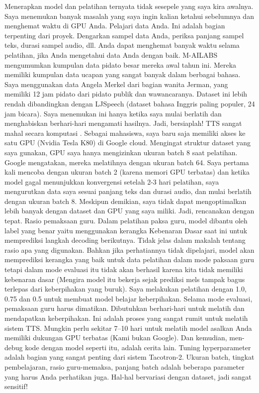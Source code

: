 Menerapkan model dan pelatihan ternyata tidak sesepele yang saya kira awalnya. Saya menemukan banyak masalah yang saya ingin kalian ketahui sebelumnya dan menghemat waktu di GPU Anda.
Pelajari data Anda. Ini adalah bagian terpenting dari proyek. Dengarkan sampel data Anda, periksa panjang sampel teks, durasi sampel audio, dll. Anda dapat menghemat banyak waktu selama pelatihan, jika Anda mengetahui data Anda dengan baik. M-AILABS mengumumkan kumpulan data pidato besar mereka awal tahun ini. Mereka memiliki kumpulan data ucapan yang sangat banyak dalam berbagai bahasa. Saya menggunakan data Angela Merkel dari bagian wanita Jerman, yang memiliki 12 jam pidato dari pidato publik dan wawancaranya. Dataset ini lebih rendah dibandingkan dengan LJSpeech (dataset bahasa Inggris paling populer, 24 jam bicara). Saya menemukan ini hanya ketika saya mulai berlatih dan menghabiskan berhari-hari mengamati hasilnya. Jadi, bersiaplah!
TTS sangat mahal secara komputasi . Sebagai mahasiswa, saya baru saja memiliki akses ke satu GPU (Nvidia Tesla K80) di Google cloud. Mengingat struktur dataset yang saya gunakan, GPU saya hanya mengizinkan ukuran batch 8 saat pelatihan. Google mengatakan, mereka melatihnya dengan ukuran batch 64. Saya pertama kali mencoba dengan ukuran batch 2 (karena memori GPU terbatas) dan ketika model gagal menunjukkan konvergensi setelah 2-3 hari pelatihan, saya mengurutkan data saya sesuai panjang teks dan durasi audio, dan mulai berlatih dengan ukuran batch 8. Meskipun demikian, saya tidak dapat mengoptimalkan lebih banyak dengan dataset dan GPU yang saya miliki. Jadi, rencanakan dengan tepat.
Rasio pemaksaan guru. Dalam pelatihan paksa guru, model dibantu oleh label yang benar yaitu menggunakan kerangka Kebenaran Dasar saat ini untuk memprediksi langkah decoding berikutnya. Tidak jelas dalam makalah tentang rasio apa yang digunakan. Bahkan jika perhatiannya tidak dipelajari, model akan memprediksi kerangka yang baik untuk data pelatihan dalam mode paksaan guru tetapi dalam mode evaluasi itu tidak akan berhasil karena kita tidak memiliki kebenaran dasar (Mengira model itu bekerja sejak prediksi mels tampak bagus terlepas dari keberpihakan yang buruk). Saya melakukan pelatihan dengan 1.0, 0.75 dan 0.5 untuk membuat model belajar keberpihakan. Selama mode evaluasi, pemaksaan guru harus dimatikan.
Dibutuhkan berhari-hari untuk melatih dan mendapatkan keberpihakan. Ini adalah proses yang sangat rumit untuk melatih sistem TTS. Mungkin perlu sekitar 7–10 hari untuk melatih model asalkan Anda memiliki dukungan GPU terbatas (Kami bukan Google). Dan kemudian, men-debug kode dengan model seperti itu, adalah cerita lain.
Tuning hyperparameter adalah bagian yang sangat penting dari sistem Tacotron-2. Ukuran batch, tingkat pembelajaran, rasio guru-memaksa, panjang batch adalah beberapa parameter yang harus Anda perhatikan juga. Hal-hal bervariasi dengan dataset, jadi sangat sensitif!

